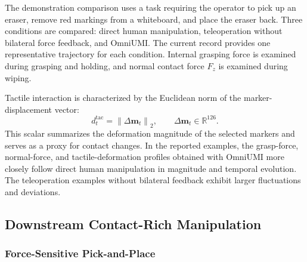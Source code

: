 The demonstration comparison uses a task requiring the operator to pick up an eraser, remove red markings from a whiteboard, and place the eraser back.
Three conditions are compared: direct human manipulation, teleoperation without bilateral force feedback, and OmniUMI.
The current record provides one representative trajectory for each condition.
Internal grasping force is examined during grasping and holding, and normal contact force $F_z$ is examined during wiping.

Tactile interaction is characterized by the Euclidean norm of the marker-displacement vector:
\begin{equation}
    d_t^{\mathrm{tac}}=\left\|\Delta\mathbf{m}_t\right\|_2,
    \qquad
    \Delta\mathbf{m}_t\in\mathbb{R}^{126}.
    \label{eq:tactile_deformation_proxy}
\end{equation}
This scalar summarizes the deformation magnitude of the selected markers and serves as a proxy for contact changes.
In the reported examples, the grasp-force, normal-force, and tactile-deformation profiles obtained with OmniUMI more closely follow direct human manipulation in magnitude and temporal evolution.
The teleoperation examples without bilateral feedback exhibit larger fluctuations and deviations.

\subsection{Downstream Contact-Rich Manipulation}

\subsubsection{Force-Sensitive Pick-and-Place}

